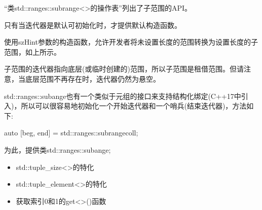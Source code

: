“类std::ranges::subrange<>的操作表”列出了子范围的API。

只有当迭代器是默认可初始化时，才提供默认构造函数。

使用szHint参数的构造函数，允许开发者将未设置长度的范围转换为设置长度的子范围，如上所示。

子范围的迭代器指向底层(或临时创建的)范围，所以子范围是租借范围。但请注意，当底层范围不再存在时，迭代器仍然为悬空。


std::ranges::subange也有一个类似于元组的接口来支持结构化绑定(C++17中引入)，所以可以很容易地初始化一个开始迭代器和一个哨兵(结束迭代器)，方法如下:

\begin{cpp}
auto [beg, end] = std::ranges::subrange{coll};
\end{cpp}

为此，提供类std::ranges::subange;

\begin{itemize}
\item
std::tuple\_size<>的特化

\item
std::tuple\_element<>的特化

\item
获取索引0和1的get<>()函数
\end{itemize}

